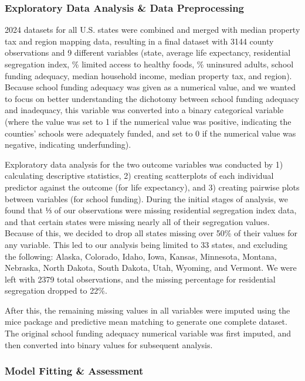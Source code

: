 \documentclass[
  10pt,
  letterpaper,
  DIV=11,
  numbers=noendperiod]{scrartcl}
\begin{document}
\subsubsection{Exploratory Data Analysis \& Data
Preprocessing}\label{exploratory-data-analysis-data-preprocessing}

2024 datasets for all U.S. states were combined and merged with median
property tax and region mapping data, resulting in a final dataset with
3144 county observations and 9 different variables (state, average life
expectancy, residential segregation index, \% limited access to healthy
foods, \% uninsured adults, school funding adequacy, median household
income, median property tax, and region). Because school funding
adequacy was given as a numerical value, and we wanted to focus on
better understanding the dichotomy between school funding adequacy and
inadequacy, this variable was converted into a binary categorical
variable (where the value was set to 1 if the numerical value was
positive, indicating the counties' schools were adequately funded, and
set to 0 if the numerical value was negative, indicating underfunding).

Exploratory data analysis for the two outcome variables was conducted by
1) calculating descriptive statistics, 2) creating scatterplots of each
individual predictor against the outcome (for life expectancy), and 3)
creating pairwise plots between variables (for school funding). During
the initial stages of analysis, we found that ⅓ of our observations were
missing residential segregation index data, and that certain states were
missing nearly all of their segregation values. Because of this, we
decided to drop all states missing over 50\% of their values for any
variable. This led to our analysis being limited to 33 states, and
excluding the following: Alaska, Colorado, Idaho, Iowa, Kansas,
Minnesota, Montana, Nebraska, North Dakota, South Dakota, Utah, Wyoming,
and Vermont. We were left with 2379 total observations, and the missing
percentage for residential segregation dropped to 22\%.

After this, the remaining missing values in all variables were imputed
using the mice package and predictive mean matching to generate one
complete dataset. The original school funding adequacy numerical
variable was first imputed, and then converted into binary values for
subsequent analysis.

\subsubsection{Model Fitting \&
Assessment}\label{model-fitting-assessment}
\end{document}
